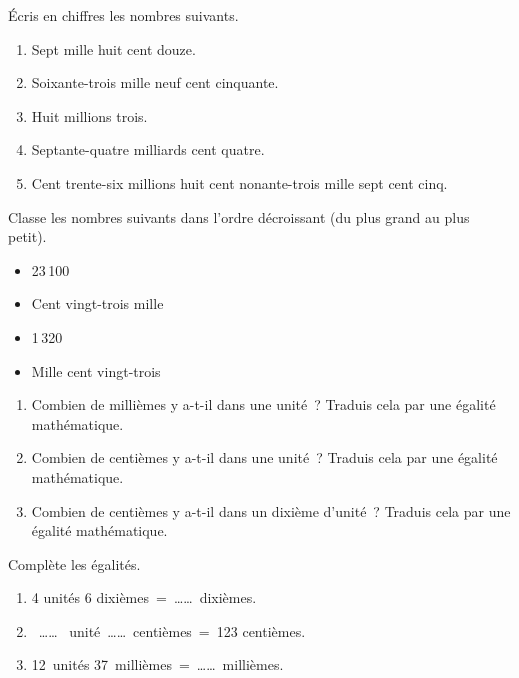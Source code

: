 \begin{exercice}
Écris en chiffres les nombres suivants.
\begin{enumerate}
 \item Sept mille huit cent douze.
 \item Soixante-trois mille neuf cent cinquante.
 \item Huit millions trois.
 \item Septante-quatre milliards cent quatre.
 \item Cent trente-six millions huit cent nonante-trois mille sept cent cinq.
 \end{enumerate}
\end{exercice}

\begin{exercice}
Classe les nombres suivants dans l'ordre décroissant (du plus grand au plus petit).
\begin{itemize}
 \item 23\,100
 \item Cent vingt-trois mille
 \item 1\,320
 \item Mille cent vingt-trois 
 \end{itemize}
\end{exercice}



\begin{exercice}
\begin{enumerate}
 \item Combien de millièmes y a-t-il dans une unité ?
Traduis cela par une égalité mathématique.
 \item Combien de centièmes y a-t-il dans une unité ? Traduis cela par une égalité mathématique.
 \item Combien de centièmes y a-t-il dans un dixième d'unité ? Traduis cela par une égalité mathématique.
 \end{enumerate}
\end{exercice}


\begin{exercice}
Complète les égalités.
\begin{enumerate}
 \item 4 unités 6 dixièmes = …… dixièmes.
 \item  ……  unité …… centièmes = 123 centièmes.
 \item 12 unités 37 millièmes = …… millièmes.
 \end{enumerate}
\end{exercice}


